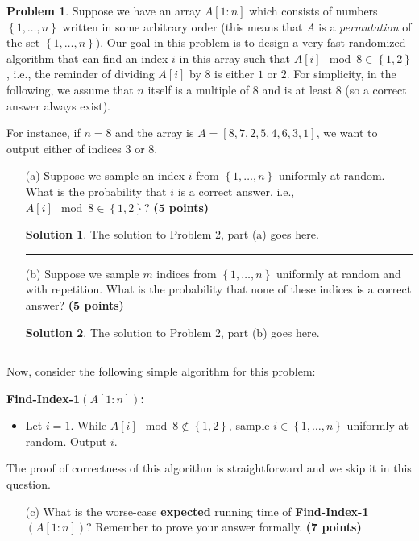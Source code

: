 \documentclass{article}
\theoremstyle{definition}
\newtheorem{problem}{Problem}
\def\fline{\rule{0.75\linewidth}{0.5pt}}
\newcommand{\finishline}{\begin{center}\fline\end{center}}
\newtheorem*{solution*}{Solution}
\newenvironment{solution}{\begin{solution*}}{{\finishline} \end{solution*}}
\newcommand{\grade}[1]{\hfill{\textbf{($\mathbf{#1}$ points)}}}
\newcommand{\set}[1]{\ensuremath{\left\{ #1 \right\}}}
\begin{document}
\begin{problem}
Suppose we have an array $A[1:n]$ which consists of numbers $\set{1,\ldots,n}$ written in some arbitrary order (this means that $A$ is a \emph{permutation} of the set $\set{1,\ldots,n}$). 
Our goal in this problem is to design a very fast randomized algorithm that can find an index $i$ in this array such that $A[i] \mod 8 \in \set{1,2}$, i.e., the reminder of dividing $A[i]$ by $8$ is either $1$ or $2$. 
For simplicity, in the following, we assume that $n$ itself is a multiple of $8$ and 
is at least $8$ (so a correct answer always exist). 

For instance, if $n=8$ and the array is $A=[8,7,2,5,4,6,3,1]$, we want to output either of indices $3$ or $8$. 

\begin{enumerate}
\item[(a)]	Suppose we sample an index $i$ from $\set{1,\ldots,n}$ uniformly at random. What is the probability that $i$ is a correct answer, i.e., $A[i] \mod 8 \in \set{1,2}$? \grade{5} 

\begin{solution}

		The solution to Problem 2, part (a) goes here. 
	\end{solution}
	
	
\item[(b)] Suppose we sample $m$ indices from $\set{1,\ldots,n}$ uniformly at random and with repetition. What is the probability that none of these indices is a correct answer?  \grade{5}

\begin{solution}

		The solution to Problem 2, part (b) goes here. 
	\end{solution}
	
	
\end{enumerate}

Now, consider the following simple algorithm for this problem: 


\textbf{Find-Index-1$(A[1:n])$:} 
\begin{itemize}
	\item Let $i=1$.  While $A[i] \mod 8 \notin \set{1,2}$, sample $i \in \set{1,\ldots,n}$ uniformly at random. Output $i$. 
\end{itemize}

The proof of correctness of this algorithm is straightforward and we skip it in this question. 

\begin{enumerate}
\item[(c)] What is the worse-case \textbf{expected} running time of \textbf{Find-Index-1$(A[1:n])$}? Remember to prove your answer formally. \grade{7} 


\end{enumerate}
\end{problem}
\end{document}
